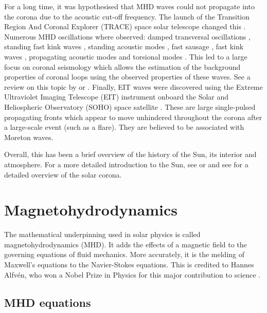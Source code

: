     For a long time, it was hypothesised that MHD waves could not propagate into the corona due to the acoustic cut-off frequency.
    The launch of the Transition Region And Coronal Explorer (TRACE) space solar telescope changed this \citep{TRACE,TRACE1}.
    Numerous MHD oscillations where observed: damped transversal oscillations \citep{8007,2002A&A...394L..39G}, standing fast kink waves \citep{1999ApJ520880A,1999Sci...285..862N,1999SoPh..187..261S}, standing acoustic modes \citep{2003A&A...406.1105W}, fast sausage \citep{2001MNRAS.326..428W,2002MNRAS.336..747W,2003A&A...406..709K}, fast kink waves \citep{2005A&A...430L..65V}, propagating acoustic modes \citep{1997ApJ...491L.111O,2000A&A...355L..23D,2002A&A...393..649M} and torsional modes \citep{1998A&A...337..287E}. 
    This led to a large focus on coronal seismology which allows the estimation of the background properties of coronal loops using the observed properties of these waves.
    See a review on this topic by \cite{lrsp-2005-3} or \cite{MHDOS}.
    Finally, EIT waves were discovered using the Extreme Ultraviolet Imaging Telescope (EIT) instrument onboard the Solar and Heliospheric Observatory (SOHO) space satellite \citep{1998GeoRL..25.2465T}.
    These are large single-pulsed propagating fronts which appear to move unhindered throughout the corona after a large-scale event (such as a flare).
    They are believed to be associated with Moreton waves.
        
    Overall, this has been a brief overview of the history of the Sun, its interior and atmosphere. 
    For a more detailed introduction to the Sun, see \cite{priest1984solar} or \cite{2014masu.book.....P} and see \cite{markus2004physics} for a detailed overview of the solar corona.
    
\section{Magnetohydrodynamics}

    The mathematical underpinning used in solar physics is called magnetohydrodynamics (MHD).
    It adds the effects of a magnetic field to the governing equations of fluid mechanics. 
    More accurately, it is the melding of Maxwell's equations to the Navier-Stokes equations.
    This is credited to Hannes Alfv\'en, who won a Nobel Prize in Physics for this major contribution to science \citep{1942Natur.150..405A,erdelyi2007}.

\subsection{MHD equations}

